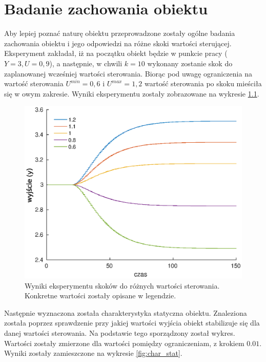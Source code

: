 \chapter{Badanie zachowania obiektu}
\label{sec:zad2}
Aby lepiej poznać naturę obiektu przeprowadzone zostały ogólne badania
zachowania obiektu i jego odpowiedzi na różne skoki wartości sterującej.
Eksperyment zakładał, iż na początku obiekt będzie w punkcie pracy
($Y = 3, U = 0,9$), a następnie, w chwili $k = 10$ wykonany zostanie skok
do zaplanowanej wcześniej wartości sterowania. Biorąc pod uwagę ograniczenia
na wartość sterowania $U^{min} = 0,6$ i $U^{max} = 1,2$ wartość sterowania
po skoku mieściła się w owym zakresie. Wyniki eksperymentu zostały zobrazowane
na wykresie \ref{fig:skoki}.
\begin{figure}
  \includegraphics{wykresy/skoki.eps}
  \caption{Wyniki eksperymentu skoków do różnych wartości sterowania. Konkretne
  wartości zostały opisane w legendzie.}
  \label{fig:skoki}
\end{figure}
Następnie wyznaczona została charakterystyka statyczna obiektu. Znaleziona
została poprzez sprawdzenie przy jakiej wartości wyjścia obiekt stabilizuje
się dla danej wartości sterowania. Na podstawie tego sporządzony został wykres.
Wartości zostały zmierzone dla wartości pomiędzy ograniczeniam, z krokiem $0.01$.
Wyniki zostały zamieszczone na wykresie \ref{fig:char_stat}.
